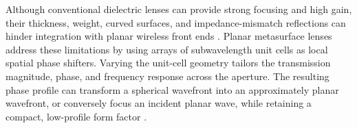 
Although conventional dielectric lenses can provide strong focusing and high gain, their thickness, weight, curved surfaces, and impedance-mismatch reflections can hinder integration with planar wireless front ends \cite{Al-Joumayly2011}. Planar metasurface lenses address these limitations by using arrays of subwavelength unit cells as local spatial phase shifters. Varying the unit-cell geometry tailors the transmission magnitude, phase, and frequency response across the aperture. The resulting phase profile can transform a spherical wavefront into an approximately planar wavefront, or conversely focus an incident planar wave, while retaining a compact, low-profile form factor \cite{Al-Joumayly2011}.




